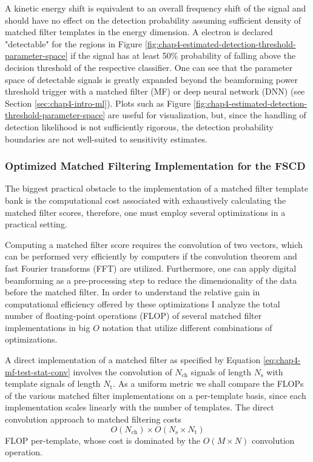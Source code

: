 A kinetic energy shift is equivalent to an overall frequency shift of the signal and should have no effect on the detection probability assuming sufficient density of matched filter templates in the energy dimension. A electron is declared "detectable" for the regions in Figure \ref{fig:chap4-estimated-detection-threshold-parameter-space} if the signal has at least 50\% probability of falling above the decision threshold of the respective classifier. One can see that the parameter space of detectable signals is greatly expanded beyond the beamforming power threshold trigger with a matched filter (MF) or deep neural network (DNN) (see Section \ref{sec:chap4-intro-ml}). Plots such as Figure \ref{fig:chap4-estimated-detection-threshold-parameter-space} are useful for visualization, but, since the handling of detection likelihood is not sufficiently rigorous, the detection probability boundaries are not well-suited to sensitivity estimates.

\subsubsection*{Optimized Matched Filtering Implementation for the FSCD}

The biggest practical obstacle to the implementation of a matched filter template bank is the computational cost associated with exhaustively calculating the matched filter scores, therefore, one must employ several optimizations in a practical setting. 

Computing a matched filter score requires the convolution of two vectors, which can be performed very efficiently by computers if the convolution theorem and fast Fourier transforms (FFT) are utilized. Furthermore, one can apply digital beamforming as a pre-processing step to reduce the dimensionality of the data before the matched filter. In order to understand the relative gain in computational efficiency offered by these optimizations I analyze the total number of floating-point operations (FLOP) of several matched filter implementations in big $O$ notation that utilize different combinations of optimizations. 

A direct implementation of a matched filter as specified by Equation \ref{eq:chap4-mf-test-stat-conv} involves the convolution of $N_\mathrm{ch}$ signals of length $N_\mathrm{s}$ with template signals of length $N_\mathrm{t}$. As a uniform metric we shall compare the FLOPs of the various matched filter implementations on a per-template basis, since each implementation scales linearly with the number of templates. The direct convolution approach to matched filtering costs
\begin{equation}
    O(N_\mathrm{ch})\times O(N_\mathrm{s}\times N_\mathrm{t})
\end{equation}
FLOP per-template, whose cost is dominated by the $O(M\times N)$ convolution operation. 

